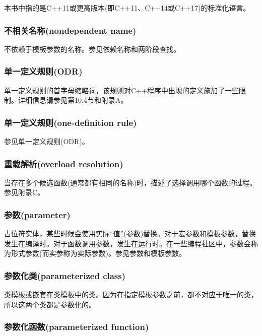 本书中指的是C++11或更高版本(即C++11、C++14或C++17)的标准化语言。

\subsubsection{不相关名称(nondependent name)}

不依赖于模板参数的名称。参见依赖名称和两阶段查找。

\subsubsection{单一定义规则(ODR)}

单一定义规则的首字母缩略词，该规则对C++程序中出现的定义施加了一些限制。详细信息请参见第10.4节和附录A。

\subsubsection{单一定义规则(one-definition rule)}

参见单一定义规则(ODR)。

\subsubsection{重载解析(overload resolution)}

当存在多个候选函数(通常都有相同的名称)时，描述了选择调用哪个函数的过程。参见附录C。

\subsubsection{参数(parameter)}

占位符实体，某些时候会使用实际“值”(参数)替换。对于宏参数和模板参数，替换发生在编译时。对于函数调用参数，发生在运行时。在一些编程社区中，参数会称为形式参数(而实参称为实际参数)。参见参数和模板参数。

\subsubsection{参数化类(parameterized class)}

类模板或嵌套在类模板中的类。因为在指定模板参数之前，都不对应于唯一的类，所以这两个类都是参数化的。

\subsubsection{参数化函数(parameterized function)}

